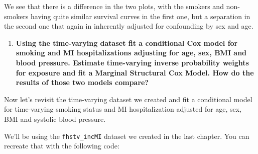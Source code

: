\documentclass[
]{book}
\newenvironment{Shaded}{\begin{snugshade}}{\end{snugshade}}
\newcommand{\CommentTok}[1]{\textcolor[rgb]{0.56,0.35,0.01}{\textit{#1}}}
\newcommand{\DataTypeTok}[1]{\textcolor[rgb]{0.13,0.29,0.53}{#1}}
\newcommand{\DecValTok}[1]{\textcolor[rgb]{0.00,0.00,0.81}{#1}}
\newcommand{\KeywordTok}[1]{\textcolor[rgb]{0.13,0.29,0.53}{\textbf{#1}}}
\newcommand{\NormalTok}[1]{#1}
\newcommand{\OperatorTok}[1]{\textcolor[rgb]{0.81,0.36,0.00}{\textbf{#1}}}
\newcommand{\OtherTok}[1]{\textcolor[rgb]{0.56,0.35,0.01}{#1}}
\newcommand{\StringTok}[1]{\textcolor[rgb]{0.31,0.60,0.02}{#1}}
\providecommand{\tightlist}{%
  \setlength{\itemsep}{0pt}\setlength{\parskip}{0pt}}
\begin{document}
We see that there is a difference in the two plots, with the smokers and non-smokers having quite similar survival curves in the first one, but a separation in the second one that again in inherently adjusted for confounding by sex and age.

\begin{enumerate}
\def\labelenumi{\arabic{enumi}.}
\setcounter{enumi}{2}
\tightlist
\item
  \textbf{Using the time-varying dataset fit a conditional Cox model for smoking and MI hospitalizations adjusting for age, sex, BMI and blood pressure. Estimate time-varying inverse probability weights for exposure and fit a Marginal Structural Cox Model. How do the results of those two models compare?}
\end{enumerate}

Now let's revisit the time-varying dataset we created and fit a conditional model for time-varying smoking status and MI hospitalization adjusted for age, sex, BMI and systolic blood pressure.

We'll be using the \texttt{fhstv\_incMI} dataset we created in the last chapter. You can recreate that with the following code:

\begin{Shaded}
\end{Shaded}
\end{document}
